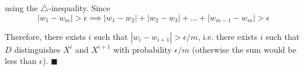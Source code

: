 \documentclass[../../main.tex]{subfiles}
\begin{document}
\noindent using the $\triangle$-inequality. Since
\begin{equation*}
    |w_1-w_m|> \epsilon \implies |w_1-w_2|+|w_2-w_3|+...+|w_{m-1}-w_m| > \epsilon
\end{equation*}

\noindent Therefore, there exists $i$ such that $|w_i-w_{i+1}|>\epsilon/m$, i.e. there exists $i$ such that $D$ distinguishes $X^i$ and $X^{i+1}$ with probability $\epsilon/m$ (otherwise the sum would be less than $\epsilon$). $\blacksquare$
\end{document}
